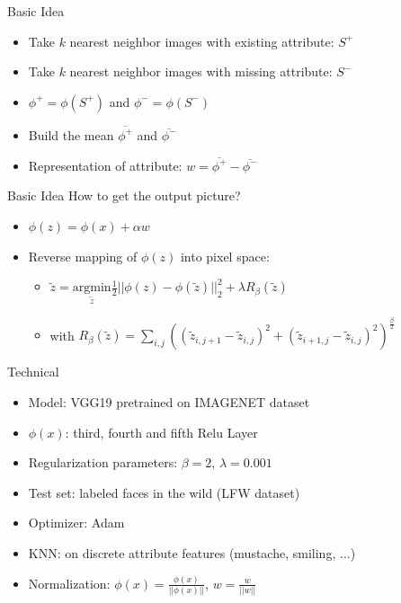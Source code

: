 \documentclass[11pt]{beamer}
\begin{document}
\begin{frame}{Basic Idea}
	\begin{itemize}
		\item Take $k$ nearest neighbor images with existing attribute: $S^+$
		\item Take $k$ nearest neighbor images with missing attribute: $S^-$
		\vfill
		\pause
		
		\item $\phi^+ = \phi(S^+)$ and $\phi^- = \phi(S^-)$
		\item Build the mean $\overline{\phi^+}$ and $\overline{\phi^-}$
		\vfill
		\pause 
		
		\item Representation of attribute: $w=\overline{\phi^+}-\overline{\phi^-}$
	\end{itemize}
\end{frame}

\begin{frame}{Basic Idea}
	How to get the output picture?
	
	\vfill
	\pause
	
	\begin{itemize}
		\item $\phi(z) = \phi(x) + \alpha w$
		\item Reverse mapping of $\phi(z)$ into pixel space:
		
		\vfill
		\pause
		\begin{itemize}
			\item $\tilde{z} = \underset{\tilde{z}}{\mathrm{argmin}} \frac{1}{2} ||\phi(z)-\phi(\tilde{z})||_2^2 + \lambda R_{\beta}(\tilde{z})$ 
			\item with $R_{\beta}(\tilde{z}) = \sum_{i,j}((\tilde{z}_{i,j+1}-\tilde{z}_{i,j})^2 + (\tilde{z}_{i+1,j}-\tilde{z}_{i,j})^2)^{\frac{\beta}{2}}$
		\end{itemize}
		 
	\end{itemize}
	
\end{frame}

\begin{frame}{Technical}
	\begin{itemize}
		\item Model: VGG19 pretrained on IMAGENET dataset
		\item $\phi(x)$: third, fourth and fifth Relu Layer
		\item Regularization parameters: $\beta=2$, $\lambda = 0.001$
		\item Test set: labeled faces in the wild (LFW dataset)
		\item Optimizer: Adam
		\item KNN: on discrete attribute features (mustache, smiling, $\dots$)
		\item Normalization: $\phi(x) = \frac{\phi(x)}{||\phi(x)||}$, $w = \frac{w}{||w||}$
	\end{itemize} 
\end{frame}
\end{document}
